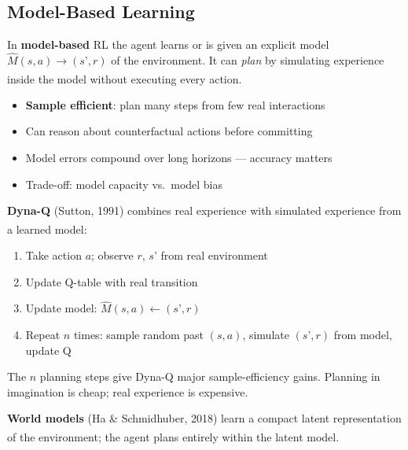     \subsection{Model-Based Learning}
    \begin{tcbitemize}[ skin=sectionraster ]

    \tcbitem[title=Model-Based RL, raster multicolumn=3]
    In \textbf{model-based} RL the agent learns or is given an explicit model
    $\hat{M}(s,a) \to (s’, r)$ of the environment. It can \emph{plan} by
    simulating experience inside the model without executing every
    action.\textsuperscript{\cite[][p.~348]{hurbansGrokkingArtificialIntelligence2020}}

    \begin{itemize}
        \item \textbf{Sample efficient}: plan many steps from few real interactions
        \item Can reason about counterfactual actions before committing
        \item Model errors compound over long horizons --- accuracy matters
        \item Trade-off: model capacity vs.\ model bias
    \end{itemize}

    \tcbitem[title={Dyna-Q: Planning + Learning}, raster multicolumn=3]
    \textbf{Dyna-Q} (Sutton, 1991) combines real experience with simulated
    experience from a learned
    model:\textsuperscript{\cite[][Ch.~8]{suttonReinforcementLearningIntroduction2018}}

    \begin{enumerate}
        \item Take action $a$; observe $r$, $s’$ from real environment
        \item Update Q-table with real transition
        \item Update model: $\hat{M}(s,a) \leftarrow (s’,r)$
        \item Repeat $n$ times: sample random past $(s,a)$, simulate
              $(s’,r)$ from model, update Q
    \end{enumerate}

    The $n$ planning steps give Dyna-Q major sample-efficiency gains.
    Planning in imagination is cheap; real experience is expensive.

    \tcbitem[title={World Models \& MPC}, raster multicolumn=3]
    \textbf{World models} (Ha \& Schmidhuber, 2018) learn a compact
    latent representation of the environment; the agent plans entirely within
    the latent model.\textsuperscript{\cite[][Ch.~8]{suttonReinforcementLearningIntroduction2018}}


\end{tcbitemize}

